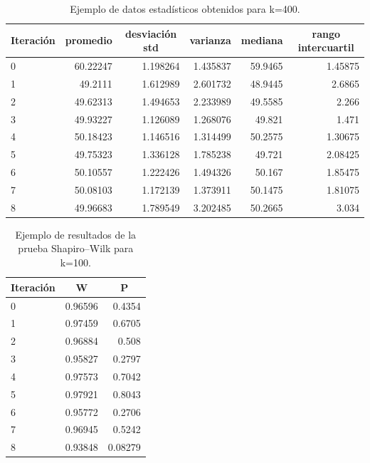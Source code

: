 \documentclass{article}
\begin{document}
\begin{table}[h!]
\centering
\caption{Ejemplo de datos estadísticos obtenidos para k=400.}
\label{tabla4}
\begin{tabular}{|l|r|r|r|r|r|}
\hline
\multicolumn{1}{|c|}{\textbf{Iteración}} & \multicolumn{1}{c|}{\textbf{promedio}} & \multicolumn{1}{c|}{\textbf{desviación std}} & \multicolumn{1}{c|}{\textbf{varianza}} & \multicolumn{1}{c|}{\textbf{mediana}} & \multicolumn{1}{c|}{\textbf{rango intercuartil}} \\ \hline
0 & 60.22247 & 1.198264 & 1.435837 & 59.9465 & 1.45875 \\ \hline
1 & 49.2111 & 1.612989 & 2.601732 & 48.9445 & 2.6865 \\ \hline
2 & 49.62313 & 1.494653 & 2.233989 & 49.5585 & 2.266 \\ \hline
3 & 49.93227 & 1.126089 & 1.268076 & 49.821 & 1.471 \\ \hline
4 & 50.18423 & 1.146516 & 1.314499 & 50.2575 & 1.30675 \\ \hline
5 & 49.75323 & 1.336128 & 1.785238 & 49.721 & 2.08425 \\ \hline
6 & 50.10557 & 1.222426 & 1.494326 & 50.167 & 1.85475 \\ \hline
7 & 50.08103 & 1.172139 & 1.373911 & 50.1475 & 1.81075 \\ \hline
8 & 49.96683 & 1.789549 & 3.202485 & 50.2665 & 3.034 \\ \hline
\end{tabular}
\end{table}

\newpage

\begin{table}[h!]
\centering
\caption{Ejemplo de resultados de la prueba Shapiro–Wilk para k=100.}
\label{tabla5}
\begin{tabular}{|l|r|r|}
\hline
\multicolumn{1}{|c|}{Iteración} & \multicolumn{1}{c|}{W} & \multicolumn{1}{c|}{P} \\ \hline
0 & 0.96596 & 0.4354 \\ \hline
1 & 0.97459 & 0.6705 \\ \hline
2 & 0.96884 & 0.508 \\ \hline
3 & 0.95827 & 0.2797 \\ \hline
4 & 0.97573 & 0.7042 \\ \hline
5 & 0.97921 & 0.8043 \\ \hline
6 & 0.95772 & 0.2706 \\ \hline
7 & 0.96945 & 0.5242 \\ \hline
8 & 0.93848 & 0.08279 \\ \hline
\end{tabular}
\end{table}
\end{document}
